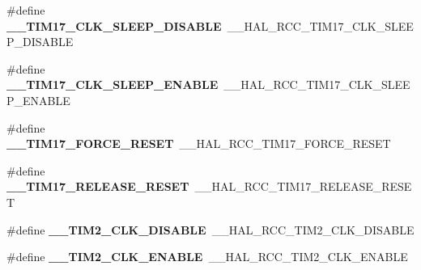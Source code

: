 \begin{DoxyCompactItemize}
\item 
\mbox{\label{group___h_a_l___r_c_c___aliased_gacad0cfe779960cb0b9444620e6ee7997}} 
\#define {\bfseries \+\_\+\+\_\+\+T\+I\+M17\+\_\+\+C\+L\+K\+\_\+\+S\+L\+E\+E\+P\+\_\+\+D\+I\+S\+A\+B\+LE}~\+\_\+\+\_\+\+H\+A\+L\+\_\+\+R\+C\+C\+\_\+\+T\+I\+M17\+\_\+\+C\+L\+K\+\_\+\+S\+L\+E\+E\+P\+\_\+\+D\+I\+S\+A\+B\+LE
\item 
\mbox{\label{group___h_a_l___r_c_c___aliased_ga7a2dbc1a3fd9cc044f437f3b3760138f}} 
\#define {\bfseries \+\_\+\+\_\+\+T\+I\+M17\+\_\+\+C\+L\+K\+\_\+\+S\+L\+E\+E\+P\+\_\+\+E\+N\+A\+B\+LE}~\+\_\+\+\_\+\+H\+A\+L\+\_\+\+R\+C\+C\+\_\+\+T\+I\+M17\+\_\+\+C\+L\+K\+\_\+\+S\+L\+E\+E\+P\+\_\+\+E\+N\+A\+B\+LE
\item 
\mbox{\label{group___h_a_l___r_c_c___aliased_ga86bf9b6f86bc9071e215bc664c8e0923}} 
\#define {\bfseries \+\_\+\+\_\+\+T\+I\+M17\+\_\+\+F\+O\+R\+C\+E\+\_\+\+R\+E\+S\+ET}~\+\_\+\+\_\+\+H\+A\+L\+\_\+\+R\+C\+C\+\_\+\+T\+I\+M17\+\_\+\+F\+O\+R\+C\+E\+\_\+\+R\+E\+S\+ET
\item 
\mbox{\label{group___h_a_l___r_c_c___aliased_gab8e7ecf7c59c1db06b2ba69bd7527e3f}} 
\#define {\bfseries \+\_\+\+\_\+\+T\+I\+M17\+\_\+\+R\+E\+L\+E\+A\+S\+E\+\_\+\+R\+E\+S\+ET}~\+\_\+\+\_\+\+H\+A\+L\+\_\+\+R\+C\+C\+\_\+\+T\+I\+M17\+\_\+\+R\+E\+L\+E\+A\+S\+E\+\_\+\+R\+E\+S\+ET
\item 
\mbox{\label{group___h_a_l___r_c_c___aliased_ga44d19f521b4c0161d7fb28c96bf5fbb7}} 
\#define {\bfseries \+\_\+\+\_\+\+T\+I\+M2\+\_\+\+C\+L\+K\+\_\+\+D\+I\+S\+A\+B\+LE}~\+\_\+\+\_\+\+H\+A\+L\+\_\+\+R\+C\+C\+\_\+\+T\+I\+M2\+\_\+\+C\+L\+K\+\_\+\+D\+I\+S\+A\+B\+LE
\item 
\mbox{\label{group___h_a_l___r_c_c___aliased_gae06cbd87c2db5dbb2aee0d47888374af}} 
\#define {\bfseries \+\_\+\+\_\+\+T\+I\+M2\+\_\+\+C\+L\+K\+\_\+\+E\+N\+A\+B\+LE}~\+\_\+\+\_\+\+H\+A\+L\+\_\+\+R\+C\+C\+\_\+\+T\+I\+M2\+\_\+\+C\+L\+K\+\_\+\+E\+N\+A\+B\+LE
\item 
\mbox{\label{group___h_a_l___r_c_c___aliased_ga6f8e4c63d5473a6af21a776fb1c20d1d}} 

\end{DoxyCompactItemize}
